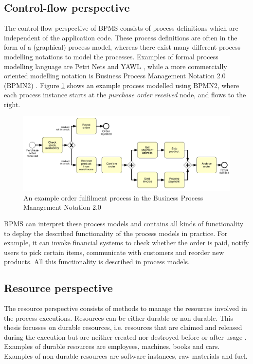 \subsection{Control-flow perspective}
The control-flow perspective of BPMS consists of process definitions which are independent of the application code. These process definitions are often in the form of a (graphical) process model, whereas there exist many different process modelling notations to model the processes. Examples of formal process modelling language are Petri Nets \cite{petrinets} and YAWL \cite{hofstede2009modern, yawl}, while a more commercially oriented modelling notation is Business Process Management Notation 2.0 (BPMN2) \cite{bpmn2}. Figure \ref{fig:bpmn} shows an example process modelled using BPMN2, where each process instance starts at the \textit{purchase order received} node, and flows to the right. 

\begin{figure}[h]
	\centering
    \includegraphics[width=\textwidth]{figures/bpmn.png}
    \caption[An example order fulfilment process in the Business Process Management Notation 2.0 ]{An example order fulfilment process in the Business Process Management Notation 2.0 {\cite{dumas2013fundamentals}} }
    \label{fig:bpmn}
\end{figure} 


BPMS can interpret these process models and contains all kinds of functionality to deploy the described functionality of the process models in practice. For example, it can invoke financial systems to check whether the order is paid, notify users to pick certain items, communicate with customers and reorder new products. All this functionality is described in process models.

\subsection{Resource perspective} \label{section:introduction_resource_perspective}
The resource perspective consists of methods to manage the resources involved in the process executions. Resources can be either durable or non-durable. This thesis focusses on durable resources, i.e. resources that are claimed and released during the execution but are neither created nor destroyed before or after usage \cite{Huang2012,Huang2011a,Russell2004}. Examples of durable resources are employees, machines, books and cars. Examples of non-durable resources are software instances, raw materials and fuel.

